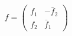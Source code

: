 \begin{equation}
f= \left(
\begin{array}{cc}
f_{1} &-\bar{f}_{2} \\
f_{2} & \bar{f}_{1}
\end{array}
\right)
\end{equation}

